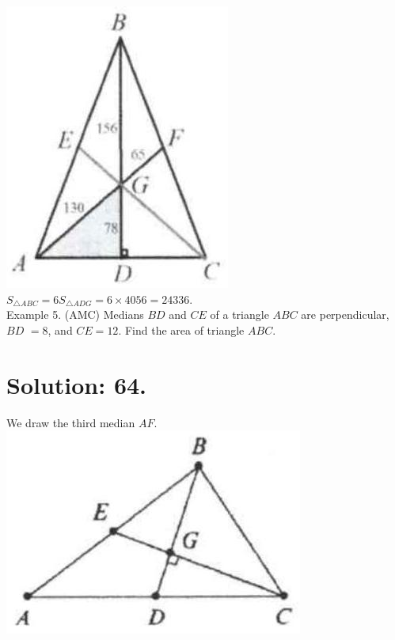 \documentclass[10pt]{article}
\begin{document}
\includegraphics[max width=\textwidth, center]{2025_04_17_97bc1f7e44d93c271a88g-010}\\
\(S_{\triangle A B C}=6 S_{\triangle A D G}=6 \times 4056=24336\).\\
Example 5. (AMC) Medians \(B D\) and \(C E\) of a triangle \(A B C\) are perpendicular, \(B D\) \(=8\), and \(C E=12\). Find the area of triangle \(A B C\).

\section*{Solution: 64.}
We draw the third median \(A F\).\\
\includegraphics[max width=\textwidth, center]{2025_04_17_97bc1f7e44d93c271a88g-010(3)}
\end{document}
